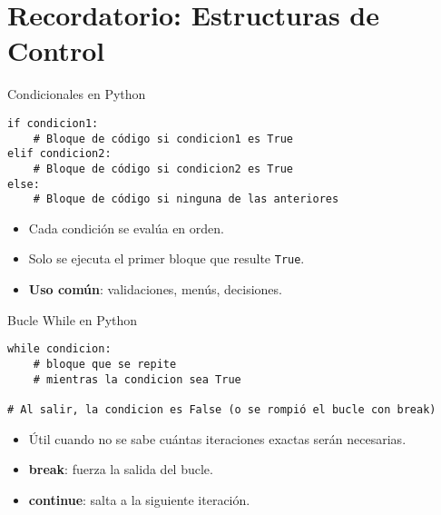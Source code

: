 \documentclass[10pt]{beamer}
\begin{document}
\section{Recordatorio: Estructuras de Control}

\begin{frame}[fragile]{Condicionales en Python}
\begin{verbatim}
if condicion1:
    # Bloque de código si condicion1 es True
elif condicion2:
    # Bloque de código si condicion2 es True
else:
    # Bloque de código si ninguna de las anteriores
\end{verbatim}
\begin{itemize}
  \item Cada condición se evalúa en orden.
  \item Solo se ejecuta el primer bloque que resulte \texttt{True}.
  \item \textbf{Uso común}: validaciones, menús, decisiones.
\end{itemize}
\end{frame}

\begin{frame}[fragile]{Bucle While en Python}
\begin{verbatim}
while condicion:
    # bloque que se repite
    # mientras la condicion sea True

# Al salir, la condicion es False (o se rompió el bucle con break)
\end{verbatim}
\begin{itemize}
  \item Útil cuando no se sabe cuántas iteraciones exactas serán necesarias.
  \item \textbf{break}: fuerza la salida del bucle.
  \item \textbf{continue}: salta a la siguiente iteración.
\end{itemize}
\end{frame}
\end{document}
